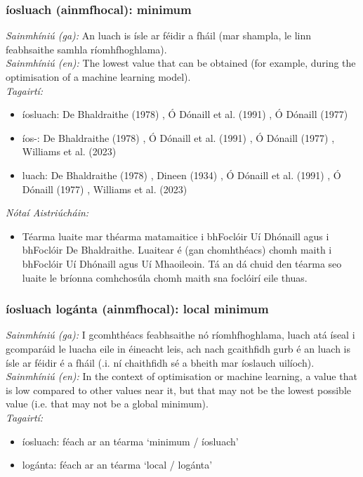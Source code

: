\subsubsection*{íosluach (ainmfhocal): minimum}
 \noindent \textit{Sainmhíniú (ga):} An luach is ísle ar féidir a fháil (mar shampla, le linn feabhsaithe samhla ríomhfhoghlama).
\\
 \noindent \textit{Sainmhíniú (en):} The lowest value that can be obtained (for example, during the optimisation of a machine learning model).
\\
 \noindent \textit{Tagairtí:}
\begin{itemize}
	\item íosluach: De Bhaldraithe (1978) \cite{de-bhaldraithe}, Ó Dónaill et al. (1991) \cite{focloir-beag}, Ó Dónaill (1977) \cite{odonaill}
	\item íos-: De Bhaldraithe (1978) \cite{de-bhaldraithe}, Ó Dónaill et al. (1991) \cite{focloir-beag}, Ó Dónaill (1977) \cite{odonaill}, Williams et al. (2023) \cite{storchiste}
	\item luach: De Bhaldraithe (1978) \cite{de-bhaldraithe}, Dineen (1934) \cite{dineen}, Ó Dónaill et al. (1991) \cite{focloir-beag}, Ó Dónaill (1977) \cite{odonaill}, Williams et al. (2023) \cite{storchiste}
\end{itemize}

 \noindent \textit{Nótaí Aistriúcháin:}
\begin{itemize}
	\item Téarma luaite mar théarma matamaitice i bhFoclóir Uí Dhónaill agus i bhFoclóir De Bhaldraithe. Luaitear é (gan chomhthéacs) chomh maith i bhFoclóir Uí Dhónaill agus Uí Mhaoileoin. Tá an dá chuid den téarma seo luaite le bríonna comhchosúla chomh maith sna foclóirí eile thuas.
\end{itemize}


\subsubsection*{íosluach logánta (ainmfhocal): local minimum}
 \noindent \textit{Sainmhíniú (ga):} I gcomhthéacs feabhsaithe nó ríomhfhoghlama, luach atá íseal i gcomparáid le luacha eile in éineacht leis, ach nach gcaithfidh gurb é an luach is ísle ar féidir é a fháil (.i. ní chaithfidh sé a bheith mar íoslauch uilíoch).
\\
 \noindent \textit{Sainmhíniú (en):} In the context of optimisation or machine learning, a value that is low compared to other values near it, but that may not be the lowest possible value (i.e. that may not be a global minimum).
\\
 \noindent \textit{Tagairtí:}
\begin{itemize}
	\item íosluach: féach ar an téarma `minimum / íosluach'
	\item logánta: féach ar an téarma `local / logánta'
\end{itemize}


